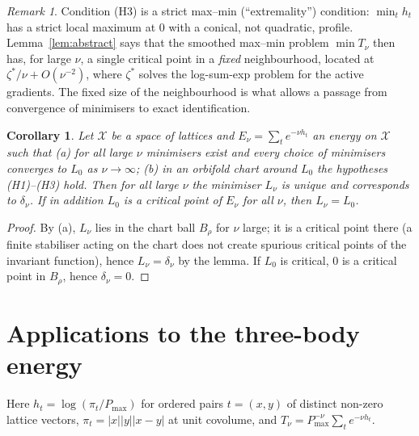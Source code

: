 \documentclass[11pt]{article}
\newtheorem{corollary}[theorem]{Corollary}
\theoremstyle{remark}\newtheorem{remark}[theorem]{Remark}
\begin{document}
\begin{remark}
Condition (H3) is a strict max--min (``extremality'') condition: $\min_t h_t$ has a strict local maximum at $0$ with a conical, not quadratic, profile. Lemma~\ref{lem:abstract} says that the smoothed max--min problem $\min T_\nu$ then has, for large $\nu$, a single critical point in a \emph{fixed} neighbourhood, located at $\zeta^*/\nu+O(\nu^{-2})$, where $\zeta^*$ solves the log-sum-exp problem for the active gradients. The fixed size of the neighbourhood is what allows a passage from convergence of minimisers to exact identification.
\end{remark}

\begin{corollary}\label{cor:global}
Let $\mathcal X$ be a space of lattices and $E_\nu=\sum_te^{-\nu h_t}$ an energy on $\mathcal X$ such that (a) for all large $\nu$ minimisers exist and every choice of minimisers converges to $L_0$ as $\nu\to\infty$; (b) in an orbifold chart around $L_0$ the hypotheses (H1)--(H3) hold. Then for all large $\nu$ the minimiser $L_\nu$ is unique and corresponds to $\delta_\nu$. If in addition $L_0$ is a critical point of $E_\nu$ for all $\nu$, then $L_\nu=L_0$.
\end{corollary}
\begin{proof}
By (a), $L_\nu$ lies in the chart ball $B_\rho$ for $\nu$ large; it is a critical point there (a finite stabiliser acting on the chart does not create spurious critical points of the invariant function), hence $L_\nu=\delta_\nu$ by the lemma. If $L_0$ is critical, $0$ is a critical point in $B_\rho$, hence $\delta_\nu=0$.
\end{proof}

\section{Applications to the three-body energy}
Here $h_t=\log(\pi_t/P_{\max})$ for ordered pairs $t=(x,y)$ of distinct non-zero lattice vectors, $\pi_t=|x||y||x-y|$ at unit covolume, and $T_\nu=P_{\max}^{-\nu}\sum_te^{-\nu h_t}$.
\end{document}
